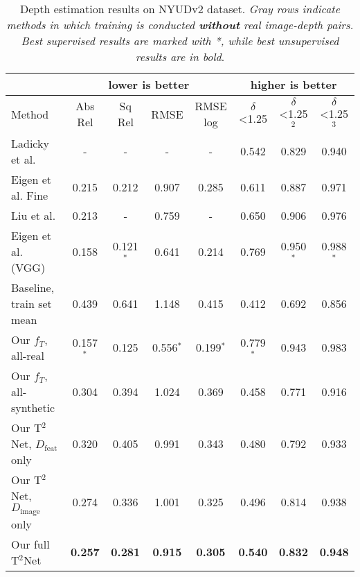 \documentclass[runningheads]{llncs}
\begin{document}
\begin{table}[tb!]
	\begin{center}
		\renewcommand{\arraystretch}{1.4}
		\setlength{\arrayrulewidth}{0.8pt}
		\caption{Depth estimation results on NYUDv2 dataset\cite{silberman2012indoor}. \emph{Gray rows indicate methods in which training is conducted \textbf{without} real image-depth pairs. Best supervised results are marked with *, while best unsupervised results are in bold}.}
		\begin{tabular}{|l|c|c|c|c|c|c|c|}
			\hline
			\multicolumn{1}{|c|}{} &  \multicolumn{4}{c|}{\cellcolor[rgb]{0.6,0.8,1.0} lower is better} &  \multicolumn{3}{c|}{\cellcolor[rgb]{0.0,0.8,1.0} higher is better} \\
			\hline
			Method & \cellcolor[rgb]{0.6,0.8,1.0} {\tiny Abs Rel} & \cellcolor[rgb]{0.6,0.8,1.0} {\tiny Sq Rel} & \cellcolor[rgb]{0.6,0.8,1.0} {\tiny RMSE} & \cellcolor[rgb]{0.6,0.8,1.0} {\tiny RMSE log} & \cellcolor[rgb]{0.0,0.8,1.0} {\tiny $\delta$<1.25} & \cellcolor[rgb]{0.0,0.8,1.0} {\tiny $\delta$<1.25$^2$}  & \cellcolor[rgb]{0.0,0.8,1.0} {\tiny $\delta$<1.25$^3$} \\
			\hline
			Ladicky et al. \cite{ladicky2014pulling} & - & - & - & - & 0.542 & 0.829 & 0.940 \\
			Eigen et al.\cite{eigen2014depth} Fine & 0.215 & 0.212 & 0.907 & 0.285 & 0.611 & 0.887 & 0.971 \\
			Liu et al. \cite{liu2016learning} & 0.213 & - & 0.759 & - & 0.650 & 0.906 & 0.976 \\
			Eigen et al.\cite{eigen2015predicting} (VGG) & 0.158 & 0.121$^*$ & 0.641 & 0.214 & 0.769 & 0.950$^*$ & 0.988$^*$ \\
			\hline 
			\rowcolor[rgb]{0.9,0.9,0.9}
			Baseline, train set mean & 0.439  & 0.641 & 1.148 & 0.415 & 0.412 & 0.692 & 0.856 \\  
			\hline
			Our $f_T$, all-real &  0.157$^*$ & 0.125 & 0.556$^*$ & 0.199$^*$ & 0.779$^*$ & 0.943 & 0.983 \\
			\rowcolor[rgb]{0.9,0.9,0.9}
			Our $f_T$, all-synthetic & 0.304 & 0.394 & 1.024 & 0.369 & 0.458 & 0.771 & 0.916 \\
			\rowcolor[rgb]{0.9,0.9,0.9}
			Our T$^2$Net, $D_\text{feat}$ only & 0.320 & 0.405 & 0.991 & 0.343 & 0.480 & 0.792 & 0.933 \\
			\rowcolor[rgb]{0.9,0.9,0.9}
			Our T$^2$Net, $D_\text{image}$ only & 0.274 & 0.336 & 1.001 & 0.325 & 0.496 & 0.814 & 0.938 \\
			\rowcolor[rgb]{0.9,0.9,0.9}
			Our full T$^2$Net & {\bf 0.257} & {\bf 0.281} & {\bf 0.915} & {\bf 0.305}  & {\bf 0.540} & {\bf 0.832} & {\bf 0.948} \\
			\hline
		\end{tabular}
		\label{table:indoor}
	\end{center}
\end{table}
\end{document}
